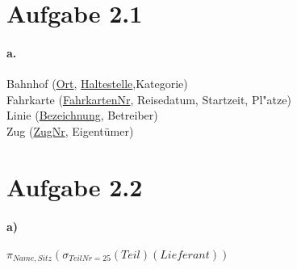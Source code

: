 \documentclass[12pt]{article}
\begin{document}
	
	
	
	
	\section*{Aufgabe 2.1}
		\paragraph*{a.}
			Bahnhof (\underline{Ort}, \underline{Haltestelle},Kategorie)\\[1.3em]
			
			Fahrkarte (\underline{FahrkartenNr}, Reisedatum, Startzeit, Pl"atze)\\[1.3em]
			
			Linie (\underline{Bezeichnung}, Betreiber)\\[1.3em]
			
			Zug (\underline{ZugNr}, Eigentümer)\\[1.3em]
		
	
	\newpage	
	\section*{Aufgabe 2.2}
	
		\paragraph*{a)}
			$\pi_{Name, Sitz}(\sigma_{TeilNr=25}(Teil)(Lieferant))$
	
		
\end{document}
